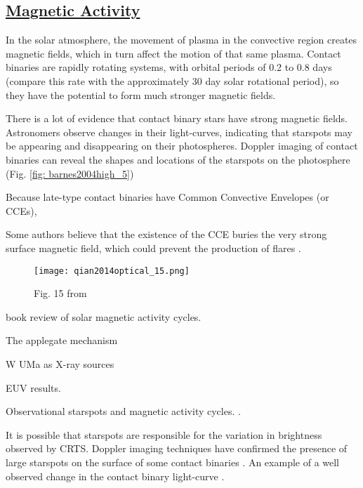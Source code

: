 \documentclass[12pt]{article} %
\numberwithin{equation}{section} %
\begin{document}
\subsection[Magnetic Activity]{\hyperlink{toc}{Magnetic Activity}}

In the solar atmosphere, the movement of plasma in the convective region creates magnetic fields, which in turn affect the motion of that same plasma. Contact binaries are rapidly rotating systems, with orbital periods of 0.2 to 0.8 days (compare this rate with the approximately 30 day solar rotational period), so they have the potential to form much stronger magnetic fields.

There is a lot of evidence that contact binary stars have strong magnetic fields. Astronomers observe changes in their light-curves, indicating that starspots may be appearing and disappearing on their photospheres. Doppler imaging of contact binaries can reveal the shapes and locations of the starspots on the photosphere (Fig. \ref{fig: barnes2004high_5})

 Because late-type contact binaries have Common Convective Envelopes (or CCEs), 

Some authors believe that the existence of the CCE buries the very strong surface magnetic field, which could prevent the production of flares \citep{qian2014optical}. 

\begin{figure}[H]
\centering
\texttt{[image: qian2014optical\_15.png]}
\caption{Fig. 15 from \citet{qian2014optical}}
\label{fig: qian2014optical_15}
\end{figure}

\citep{balogh2015solar} book review of solar magnetic activity cycles.

The applegate mechanism \citep{applegate1992mechanism} \citep{lanza2006internal}

W UMa as X-ray sources \citep{stepien2001rosat}

\citep{rucinski1998extreme} EUV results.

Observational starspots and magnetic activity cycles.  \citep{borkovits2005indirect,qian2000possible,kaszas1998period,qian2007ad,lee2004period,yang2012deep,zhang2004long}.

It is possible that starspots are responsible for the variation in brightness observed by CRTS. Doppler imaging techniques have confirmed the presence of large starspots on the surface of some contact binaries \citep{barnes2004high}.  An example of a well observed change in the contact binary light-curve \citep{gazeas2006modeling}.
\end{document}
